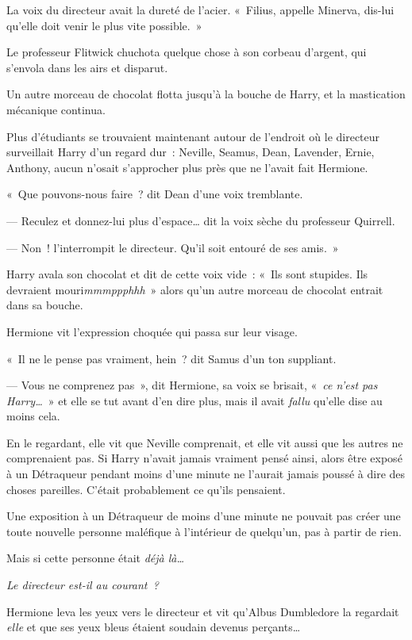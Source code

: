 La voix du directeur avait la dureté de l'acier. «~Filius, appelle Minerva, dis-lui qu'elle doit venir le plus vite possible.~»

Le professeur Flitwick chuchota quelque chose à son corbeau d'argent, qui s'envola dans les airs et disparut.

Un autre morceau de chocolat flotta jusqu'à la bouche de Harry, et la mastication mécanique continua.

Plus d'étudiants se trouvaient maintenant autour de l'endroit où le directeur surveillait Harry d'un regard dur~: Neville, Seamus, Dean, Lavender, Ernie, Anthony, aucun n'osait s'approcher plus près que ne l'avait fait Hermione.

«~Que pouvons-nous faire~? dit Dean d'une voix tremblante.

--- Reculez et donnez-lui plus d'espace… dit la voix sèche du professeur Quirrell.

--- Non~! l'interrompit le directeur. Qu'il soit entouré de ses amis.~»

Harry avala son chocolat et dit de cette voix vide~: «~Ils sont stupides. Ils devraient mouri\emph{mmmppphhh}~» alors qu'un autre morceau de chocolat entrait dans sa bouche.

Hermione vit l'expression choquée qui passa sur leur visage.

«~Il ne le pense pas vraiment, hein~? dit Samus d'un ton suppliant.

--- Vous ne comprenez pas~», dit Hermione, sa voix se brisait, «~\emph{ce n'est pas Harry…}~» et elle se tut avant d'en dire plus, mais il avait \emph{fallu} qu'elle dise au moins cela.

En le regardant, elle vit que Neville comprenait, et elle vit aussi que les autres ne comprenaient pas. Si Harry n'avait jamais vraiment pensé ainsi, alors être exposé à un Détraqueur pendant moins d'une minute ne l'aurait jamais poussé à dire des choses pareilles. C'était probablement ce qu'ils pensaient.

Une exposition à un Détraqueur de moins d'une minute ne pouvait pas créer une toute nouvelle personne maléfique à l'intérieur de quelqu'un, pas à partir de rien.

Mais si cette personne était \emph{déjà là…}

\emph{Le directeur est-il au courant~?}

Hermione leva les yeux vers le directeur et vit qu'Albus Dumbledore la regardait \emph{elle} et que ses yeux bleus étaient soudain devenus perçants…

